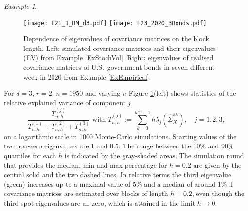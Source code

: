 \documentclass[preprint,aos]{imsart}
\numberwithin{equation}{section}
\theoremstyle{remark}
\newtheorem{example}[satz]{Example}
\begin{document}
\begin{example}
\begin{figure}[t]
\centering
\texttt{[image: E21\_1\_BM\_d3.pdf]} \texttt{[image: E23\_2020\_3Bonds.pdf]}
 \caption{Dependence of eigenvalues of covariance matrices on the block length. Left:  simulated covariance matrices and their eigenvalues (EV) from Example \ref{ExStochVol}. Right:  eigenvalues of realised covariance matrices of U.S.\ government bonds in seven different week in 2020 from Example \ref{ExEmpirical}.   }\label{FigEx}
\end{figure}


For $d=3$, $r=2$, $n=1950$ and varying $h$ Figure \ref{FigEx}(left) shows statistics of the relative explained variance of component $j$ \begin{equation}\label{EqExplVar}
\frac{T_{n,h}^{(j)}}{T_{n,h}^{(1)}+T_{n,h}^{(2)}+T_{n,h}^{(3)}}\text{ with } T_{n,h}^{(j)}:=\sum_{k=0}^{h^{-1}-1}h\lambda_j(\hat\Sigma_X^{kh}),\quad j=1,2,3,
\end{equation}
on a logarithmic scale in 1000 Monte-Carlo simulations. Starting values of the two non-zero eigenvalues are 1 and 0.5. %
The range between the 10\% and 90\% quantiles for each $h$ is indicated by the gray-shaded areas. The simulation round that provides the median, min and max percentage for $h=0.2$ are given by the central solid and the two dashed lines. In relative terms the third eigenvalue (green) increases up to a maximal value of 5\% and a median of around 1\% if covariance matrices are estimated over blocks of length $h=0.2$, even though the third spot eigenvalues are all zero, which is attained in the limit $h\to 0$.
\end{example}
\end{document}
